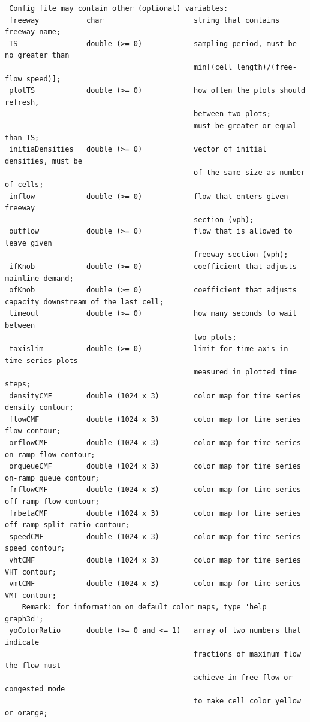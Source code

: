 \documentclass[UTF8,12.05pt]{ctexart}
\begin{document}
\begin{lstlisting}
 Config file may contain other (optional) variables:
 freeway           char                     string that contains freeway name;
 TS                double (>= 0)            sampling period, must be no greater than
                                            min[(cell length)/(free-flow speed)];
 plotTS            double (>= 0)            how often the plots should refresh,
                                            between two plots;
                                            must be greater or equal than TS;
 initiaDensities   double (>= 0)            vector of initial densities, must be
                                            of the same size as number of cells;
 inflow            double (>= 0)            flow that enters given freeway
                                            section (vph);
 outflow           double (>= 0)            flow that is allowed to leave given
                                            freeway section (vph);
 ifKnob            double (>= 0)            coefficient that adjusts mainline demand;
 ofKnob            double (>= 0)            coefficient that adjusts capacity downstream of the last cell;
 timeout           double (>= 0)            how many seconds to wait between
                                            two plots;
 taxislim          double (>= 0)            limit for time axis in time series plots
                                            measured in plotted time steps;
 densityCMF        double (1024 x 3)        color map for time series density contour;
 flowCMF           double (1024 x 3)        color map for time series flow contour;
 orflowCMF         double (1024 x 3)        color map for time series on-ramp flow contour;
 orqueueCMF        double (1024 x 3)        color map for time series on-ramp queue contour;
 frflowCMF         double (1024 x 3)        color map for time series off-ramp flow contour;
 frbetaCMF         double (1024 x 3)        color map for time series off-ramp split ratio contour;
 speedCMF          double (1024 x 3)        color map for time series speed contour;
 vhtCMF            double (1024 x 3)        color map for time series VHT contour;
 vmtCMF            double (1024 x 3)        color map for time series VMT contour;
    Remark: for information on default color maps, type 'help graph3d';
 yoColorRatio      double (>= 0 and <= 1)   array of two numbers that indicate
                                            fractions of maximum flow the flow must
                                            achieve in free flow or congested mode
                                            to make cell color yellow or orange;

\end{lstlisting}
\end{document}
